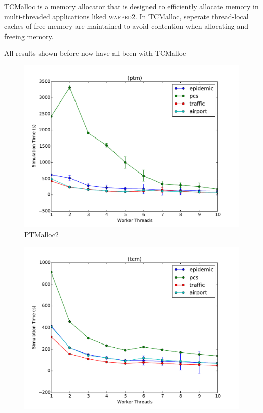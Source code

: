 \documentclass[11pt]{book}
\begin{document}
TCMalloc is a memory allocator that is designed to efficiently allocate memory in
multi-threaded applications liked \textsc{warped2}. In TCMalloc, seperate thread-local
caches of free memory are maintained to avoid contention when allocating and freeing memory.

All results shown before now have all been with TCMalloc

\begin{figure}
  \begin{minipage}{.5\textwidth}
    \begin{center}
      \includegraphics[width=\textwidth,keepaspectratio,quiet]{figs/memory_allocation/ptm_times.pdf} \\
      PTMalloc2 \\
    \end{center}
  \end{minipage}%
  \hfill
  \begin{minipage}{.5\textwidth}
    \begin{center}
      \includegraphics[width=\textwidth,keepaspectratio,quiet]{figs/memory_allocation/tcm_times.pdf} \\

\end{center}
\end{minipage}
\end{figure}
\end{document}
